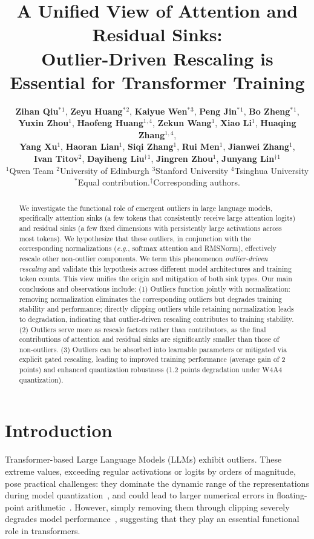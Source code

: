\documentclass{article} %
\author{\textbf{Zihan Qiu}$^*$$^{1}$, \textbf{Zeyu Huang}$^*$$^{2}$, \textbf{Kaiyue Wen}$^*$$^{3}$, \textbf{Peng Jin}$^*$$^{1}$,  \textbf{Bo Zheng}$^*$$^{1}$,  \\   \textbf{Yuxin Zhou}$^{1}$, \textbf{Haofeng Huang}$^{1,4}$, \textbf{Zekun Wang}$^{1}$, \textbf{Xiao Li}$^{1}$, \textbf{Huaqing Zhang}$^{1,4}$, \\ \textbf{Yang Xu}$^{1}$, \textbf{Haoran Lian}$^{1}$, \textbf{Siqi Zhang}$^{1}$, \textbf{Rui Men}$^{1}$, \textbf{Jianwei Zhang}$^{1}$, \\ \textbf{Ivan Titov}$^{2}$, \textbf{Dayiheng Liu}$^\dagger$$^{1}$, \textbf{Jingren Zhou}$^{1}$, \textbf{Junyang Lin}$^\dagger$$^{1}$
\\$^1$Qwen Team $^2$University of Edinburgh $^3$Stanford University  $^4$Tsinghua University \\
\small $^*$Equal contribution.\quad $^\dagger$Corresponding authors.
}
\title{A Unified View of Attention and Residual Sinks: \\Outlier-Driven Rescaling is Essential for Transformer Training}
\begin{document}
\maketitle

\begin{abstract}
We investigate the functional role of emergent outliers in large language models, specifically attention sinks (a few tokens that consistently receive large attention logits) and residual sinks (a few fixed dimensions with persistently large activations across most tokens).
We hypothesize that these outliers, in conjunction with the corresponding normalizations (\textit{e.g.}, softmax attention and RMSNorm), effectively rescale other non-outlier components.
We term this phenomenon \textit{outlier-driven rescaling} and validate this hypothesis across different model architectures and training token counts.
This view unifies the origin and mitigation of both sink types.
Our main conclusions and observations include:
(1) Outliers function jointly with normalization: removing normalization 
eliminates the corresponding outliers but degrades training stability and performance; directly clipping outliers while retaining normalization leads to degradation, indicating that outlier-driven rescaling contributes to training stability.
(2) Outliers serve more as rescale factors rather than contributors, as the final contributions of attention and residual sinks are significantly smaller than those of non-outliers.
(3) Outliers can be absorbed into learnable parameters or mitigated via explicit gated rescaling, leading to improved training performance (average gain of 2 points) and enhanced quantization robustness (1.2 points degradation under W4A4 quantization).
\end{abstract}

\section{Introduction}

Transformer-based Large Language Models (LLMs) exhibit outliers. 
These extreme values, exceeding regular activations or logits by orders of magnitude, pose practical challenges: they dominate the dynamic range of the representations during model quantization~\citep{yao2022zeroquant,xiao2023efficient,xiao2023smoothquant,wei2023outlier,nvfp4}, and could lead to larger numerical errors in floating-point arithmetic~\citep{budzinskiy2025numerical}. 
However, simply removing them through clipping severely degrades model performance~\citep{kovaleva2021bert,sun2024massive}, suggesting that they play an essential functional role in transformers. 
\end{document}
